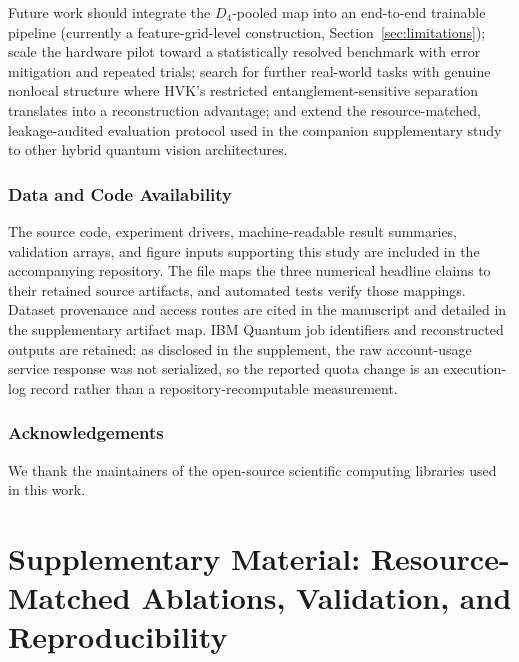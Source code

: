 \documentclass[11pt]{article}
\begin{document}
Future work should integrate the $D_4$-pooled map into an end-to-end trainable pipeline (currently a feature-grid-level construction, Section~\ref{sec:limitations}); scale the hardware pilot toward a statistically resolved benchmark with error mitigation and repeated trials; search for further real-world tasks with genuine nonlocal structure where HVK's restricted entanglement-sensitive separation translates into a reconstruction advantage; and extend the resource-matched, leakage-audited evaluation protocol used in the companion supplementary study to other hybrid quantum vision architectures.

\section*{Data and Code Availability}
The source code, experiment drivers, machine-readable result summaries, validation arrays, and figure inputs supporting this study are included in the accompanying repository. The file  maps the three numerical headline claims to their retained source artifacts, and automated tests verify those mappings. Dataset provenance and access routes are cited in the manuscript and detailed in the supplementary artifact map. IBM Quantum job identifiers and reconstructed outputs are retained; as disclosed in the supplement, the raw account-usage service response was not serialized, so the reported quota change is an execution-log record rather than a repository-recomputable measurement.

\section*{Acknowledgements}
We thank the maintainers of the open-source scientific computing libraries used in this work.


\part{Supplementary Material: Resource-Matched Ablations, Validation, and Reproducibility}
\end{document}
